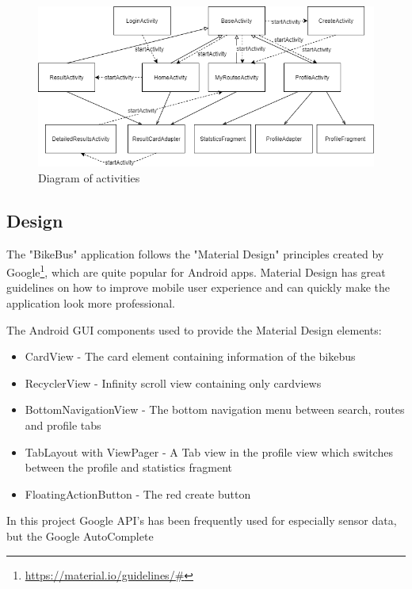\begin{figure}
    \centering
    \includegraphics[scale=0.5]{Graphics/Images/Activity_Diagram.png}
    \caption{Diagram of activities}
    \label{fig:my_label}
\end{figure}


\subsection{Design}
The "BikeBus" application follows the "Material Design" principles created by Google\footnote{\url{https://material.io/guidelines/#}}, which are quite popular for Android apps. Material Design has great guidelines on how to improve mobile user experience and can quickly make the application look more professional.

The Android GUI components used to provide the Material Design elements:
\begin{itemize}
    \item CardView - The card element containing information of the bikebus
    \item RecyclerView - Infinity scroll view containing only cardviews
    \item BottomNavigationView - The bottom navigation menu between search, routes and profile tabs
    \item TabLayout with ViewPager - A Tab view in the profile view which switches between the profile and statistics fragment
    \item FloatingActionButton - The red create button
\end{itemize}

In this project Google API's has been frequently used for especially sensor data, but the Google AutoComplete

